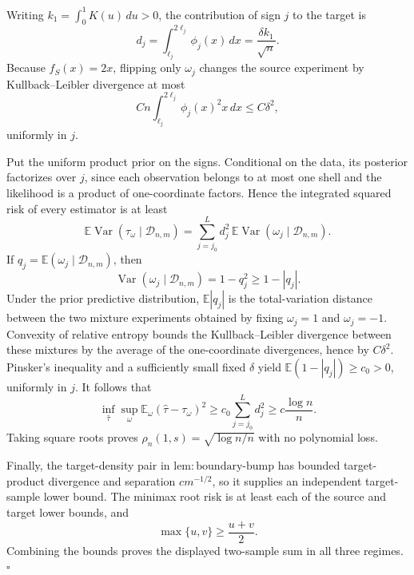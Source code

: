 Writing \(k_1=\int_0^1K(u)\,du>0\), the contribution of sign \(j\) to the target is
\[
 d_j=\int_{\ell_j}^{2\ell_j}\phi_j(x)\,dx
 =\frac{\delta k_1}{\sqrt n}.
\]
Because \(f_S(x)=2x\), flipping only \(\omega_j\) changes the source experiment by Kullback--Leibler divergence at most
\[
 Cn\int_{\ell_j}^{2\ell_j}\phi_j(x)^2x\,dx
 \le C\delta^2,
\]
uniformly in \(j\).

Put the uniform product prior on the signs.  Conditional on the data, its posterior factorizes over \(j\), since each observation belongs to at most one shell and the likelihood is a product of one-coordinate factors.  Hence the integrated squared risk of every estimator is at least
\[
 \mathbb E\operatorname{Var}(\tau_\omega\mid\mathcal D_{n,m})
 =\sum_{j=j_0}^Ld_j^2\,
   \mathbb E\operatorname{Var}(\omega_j\mid\mathcal D_{n,m}).
\]
If \(q_j=\mathbb E(\omega_j\mid\mathcal D_{n,m})\), then
\[
 \operatorname{Var}(\omega_j\mid\mathcal D_{n,m})=1-q_j^2\ge1-|q_j|.
\]
Under the prior predictive distribution, \(\mathbb E|q_j|\) is the total-variation distance between the two mixture experiments obtained by fixing \(\omega_j=1\) and \(\omega_j=-1\).  Convexity of relative entropy bounds the Kullback--Leibler divergence between these mixtures by the average of the one-coordinate divergences, hence by \(C\delta^2\).  Pinsker's inequality and a sufficiently small fixed \(\delta\) yield \(\mathbb E(1-|q_j|)\ge c_0>0\), uniformly in \(j\).  It follows that
\[
 \inf_{\widehat\tau}\sup_\omega
 \mathbb E_\omega(\widehat\tau-\tau_\omega)^2
 \ge c_0\sum_{j=j_0}^Ld_j^2
 \ge c\frac{\log n}{n}.
\]
Taking square roots proves \(\rho_n(1,s)=\sqrt{\log n/n}\) with no polynomial loss.

Finally, the target-density pair in \(\mathrm{lem:boundary\text{-}bump}\) has bounded target-product divergence and separation \(cm^{-1/2}\), so it supplies an independent target-sample lower bound.  The minimax root risk is at least each of the source and target lower bounds, and
\[
 \max\{u,v\}\ge\frac{u+v}{2}.
\]
Combining the bounds proves the displayed two-sample sum in all three regimes. \(\square\)